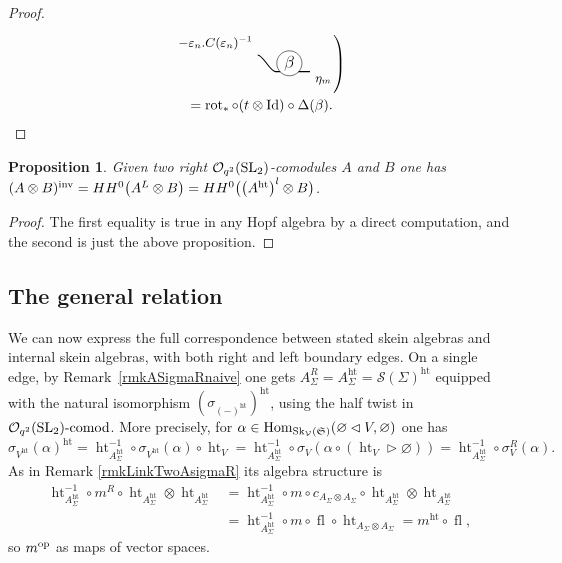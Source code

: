 \documentclass[pdftex]{sigma}%
\numberwithin{equation}{section}
\newtheorem{Proposition}[Theorem]{Proposition}
 { \theoremstyle{definition}
\newtheorem{Definition}[Theorem]{Definition}
\newtheorem{Note}[Theorem]{Note}
\newtheorem{Example}[Theorem]{Example}
\newtheorem{Remark}[Theorem]{Remark} }
\newcommand{\halft}{{\operatorname{ht}}}
\newcommand{\Hom}{\operatorname{Hom}}
\newcommand{\Oqcom}{\Oq\text{-}{\rm comod}}
\newcommand{\Oq}{\mathcal{O}_{q^2}({\rm SL}_2)}
\begin{document}
\begin{proof}
\begin{gather*}
\begin{tikzpicture}[scale = 0.7, baseline = 0pt, rotate = 180]
\draw[thick] (-0.94,0.3) node[below right]{\small $\eta_m$} -- (0.3,0.3) .. controls (0.5,0.3) and (0.74,-0.3).. (0.94,-0.3)node[above left]{\small $-\varepsilon_n.C(\varepsilon_n)^{-1}$};
\node[circle, fill=white, draw = black, scale = 1.2, inner sep = 1.5pt] (X) at (-0.2,0){$\beta$};
\end{tikzpicture}\!\!
\raisebox{-3pt}{$\left.\rule{0pt}{24pt}\right)$}
\\ \qquad
{}= \operatorname{rot}_* \circ (t \otimes {\rm Id}) \circ \Delta(\beta).
\tag*{\qed}
\end{gather*}
\renewcommand{\qed}{}
\end{proof}

\begin{Proposition}\label{propInvHHO}
Given two right $\Oq$-comodules $A$ and $B$ one has $ (A \otimes B)^{{\rm inv}} = HH^0\big(A^L \otimes B\big) \allowbreak= HH^0\big(\big(A^\halft\big)^l \otimes B\big)$.
\end{Proposition}

\begin{proof}
The first equality is true in any Hopf algebra by a direct computation, and the second is just the above proposition.
\end{proof}

\subsection{The general relation}
We can now express the full correspondence between stated skein algebras and internal skein algebras, with both right and left boundary edges.
On a single edge, by Remark~\ref{rmkASigmaRnaive} one gets $A_\Sigma^R = A_\Sigma^\halft = \mathscr{S}(\Sigma)^\halft$ equipped with the natural isomorphism $(\sigma_{(-)^\halft})^\halft$, using the half twist in $\Oqcom$. More precisely, for $\alpha \in \Hom_{{\rm Sk}_\mathcal{V}(\mathfrak{S})}(\varnothing\lhd V,\varnothing)$ one has
\[
\sigma_{V^\halft}(\alpha)^\halft = \halft_{A_\Sigma^\halft}^{-1} \circ \sigma_{V^\halft}(\alpha) \circ \halft_V = \halft_{A_\Sigma^\halft}^{-1} \circ \sigma_{V}(\alpha \circ (\halft_V \rhd\varnothing)) = \halft_{A_\Sigma^\halft}^{-1} \circ \sigma^R_{V}(\alpha).
\]
As in Remark \ref{rmkLinkTwoAsigmaR} its algebra structure is
\begin{align*}
\halft_{A_\Sigma^\halft}^{-1} \circ m^R \circ \halft_{A_\Sigma^\halft} \otimes \halft_{A_\Sigma^\halft} & = \halft_{A_\Sigma^\halft}^{-1} \circ m \circ c_{A_\Sigma \otimes A_\Sigma} \circ \halft_{A_\Sigma^\halft} \otimes \halft_{A_\Sigma^\halft} \\
& = \halft_{A_\Sigma^\halft}^{-1} \circ m \circ \operatorname{fl} \circ \halft_{A_\Sigma \otimes A_\Sigma} = m^\halft \circ \operatorname{fl},
\end{align*}
so $m^{\rm op}$ as maps of vector spaces.
\end{document}
